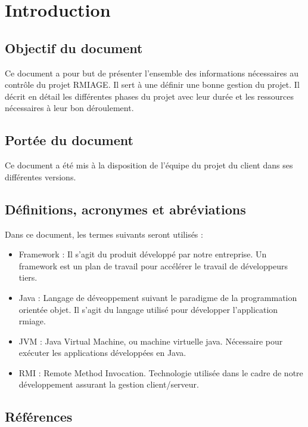 
\section{Introduction}
\subsection{Objectif du document}
Ce document a pour but de présenter l'ensemble des informations nécessaires au contrôle du projet RMIAGE. Il sert à une définir une bonne gestion du projet.
Il décrit en détail les différentes phases du projet avec leur durée et les ressources nécessaires à leur bon déroulement.

\subsection{Portée du document}
Ce document a été mis à la disposition de l’équipe du projet du client dans ses différentes versions.

\subsection{Définitions, acronymes et abréviations}
Dans ce document, les termes suivants seront utilisés :
\begin{itemize}
	\item Framework :
Il s'agit du produit développé par notre entreprise. Un framework est un plan de travail pour accélérer le travail de développeurs tiers.
	\item Java :
Langage de déveoppement suivant le paradigme de la programmation orientée objet. Il s'agit du langage utilisé pour développer l'application rmiage.
	\item JVM :
Java Virtual Machine, ou machine virtuelle java. Nécessaire pour exécuter les applications développées en Java.
	\item RMI :
Remote Method Invocation. Technologie utilisée dans le cadre de notre développement assurant la gestion client/serveur.
\end{itemize}

\subsection{Références}
